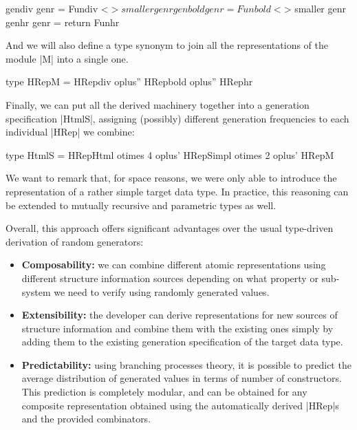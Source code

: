\begin{code}
  gendiv   genr  = Fundiv <$> smaller genr
  genbold  genr  = Funbold <$> smaller genr
  genhr    genr  = return Funhr
\end{code} %

And we will also define a type synonym to join all the representations of the
module |M| into a single one.

\begin{code}
type HRepM  = HRepdiv oplus''  HRepbold oplus''  HRephr
\end{code}

Finally, we can put all the derived machinery together into a generation
specification |HtmlS|, assigning (possibly) different generation frequencies to
each individual |HRep| we combine:

\begin{code}
type HtmlS  =       HRepHtml   otimes 4
            oplus'  HRepSimpl  otimes 2
            oplus'  HRepM
\end{code}


%   


We want to remark that, for space reasons, we were only able to introduce the
representation of a rather simple target data type.
%
In practice, this reasoning can be extended to mutually recursive and parametric
types as well.


Overall, this approach offers significant advantages over the usual type-driven
derivation of random generators:
%
\begin{itemize}
\item \textbf{Composability:} we can combine different atomic representations
  using different structure information sources depending on what property or
  sub-system we need to verify using randomly generated values.
\item \textbf{Extensibility:} the developer can derive representations for new
  sources of structure information and combine them with the existing ones
  simply by adding them to the existing generation specification of the target
  data type.
\item \textbf{Predictability:} using branching processes theory, it is possible
  to predict the average distribution of generated values in terms of number of
  constructors.
  This prediction is completely modular, and can be obtained for any composite
  representation obtained using the automatically derived |HRep|s and the
  provided combinators.
\end{itemize}


